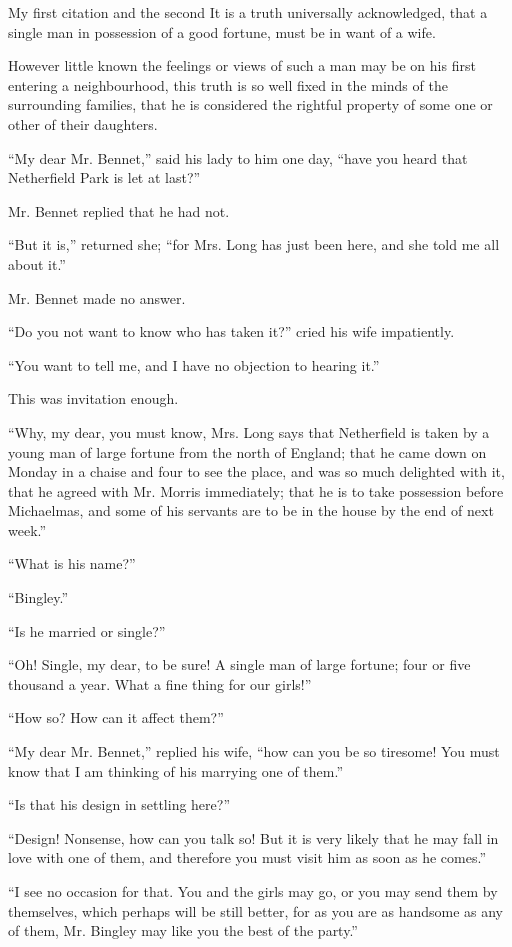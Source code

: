 My first citation \textcite{latexcompanion} and the second \parencite[See \S 2][]{einstein}
It is a truth universally acknowledged, that a single man in
possession of a good fortune, must be in want of a wife.

However little known the feelings or views of such a man may be
on his first entering a neighbourhood, this truth is so well
fixed in the minds of the surrounding families, that he is
considered the rightful property of some one or other of their
daughters.

“My dear Mr. Bennet,” said his lady to him one day, “have you
heard that Netherfield Park is let at last?”

Mr. Bennet replied that he had not.

“But it is,” returned she; “for Mrs. Long has just been here, and
she told me all about it.”

Mr. Bennet made no answer.

“Do you not want to know who has taken it?” cried his wife
impatiently.

“You want to tell me, and I have no objection to hearing it.”

This was invitation enough.

“Why, my dear, you must know, Mrs. Long says that Netherfield is
taken by a young man of large fortune from the north of England;
that he came down on Monday in a chaise and four to see the
place, and was so much delighted with it, that he agreed with Mr.
Morris immediately; that he is to take possession before
Michaelmas, and some of his servants are to be in the house by
the end of next week.”

“What is his name?”

“Bingley.”

“Is he married or single?”

“Oh! Single, my dear, to be sure! A single man of large fortune;
four or five thousand a year. What a fine thing for our girls!”

“How so? How can it affect them?”

“My dear Mr. Bennet,” replied his wife, “how can you be so
tiresome! You must know that I am thinking of his marrying one of
them.”

“Is that his design in settling here?”

“Design! Nonsense, how can you talk so! But it is very likely
that he may fall in love with one of them, and therefore you
must visit him as soon as he comes.”

“I see no occasion for that. You and the girls may go, or you may
send them by themselves, which perhaps will be still better, for
as you are as handsome as any of them, Mr. Bingley may like you
the best of the party.”

